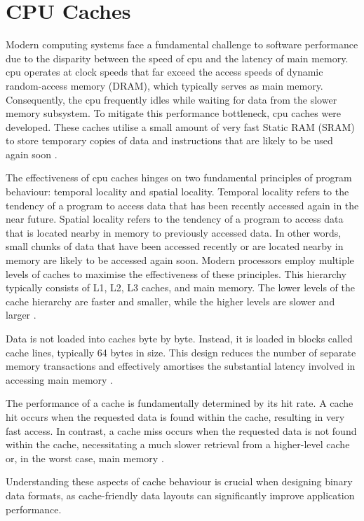 \section{CPU Caches}
\label{tb:cache}
Modern computing systems face a fundamental challenge to software performance due to the disparity between the speed of \ac{cpu} and the latency of main memory. \ac{cpu} operates at clock speeds that far exceed the access speeds of dynamic random-access memory (DRAM), which typically serves as main memory. Consequently, the \ac{cpu} frequently idles while waiting for data from the slower memory subsystem. To mitigate this performance bottleneck, \ac{cpu} caches were developed. These caches utilise a small amount of very fast Static RAM (SRAM) to store temporary copies of data and instructions that are likely to be used again soon \citep{drepper_2007}.

The effectiveness of \ac{cpu} caches hinges on two fundamental principles of program behaviour: temporal locality and spatial locality. Temporal locality refers to the tendency of a program to access data that has been recently accessed again in the near future. Spatial locality refers to the tendency of a program to access data that is located nearby in memory to previously accessed data. In other words, small chunks of data that have been accessed recently or are located nearby in memory are likely to be accessed again soon. Modern processors employ multiple levels of caches to maximise the effectiveness of these principles. This hierarchy typically consists of L1, L2, L3 caches, and main memory. The lower levels of the cache hierarchy are faster and smaller, while the higher levels are slower and larger \citep{drepper_2007}.

Data is not loaded into caches byte by byte. Instead, it is loaded in blocks called cache lines, typically 64 bytes in size. This design reduces the number of separate memory transactions and effectively amortises the substantial latency involved in accessing main memory \citep{drepper_2007}.

The performance of a cache is fundamentally determined by its hit rate. A cache hit occurs when the requested data is found within the cache, resulting in very fast access. In contrast, a cache miss occurs when the requested data is not found within the cache, necessitating a much slower retrieval from a higher-level cache or, in the worst case, main memory \citep{abayomi_2020}.

Understanding these aspects of cache behaviour is crucial when designing binary data formats, as cache-friendly data layouts can significantly improve application performance.

